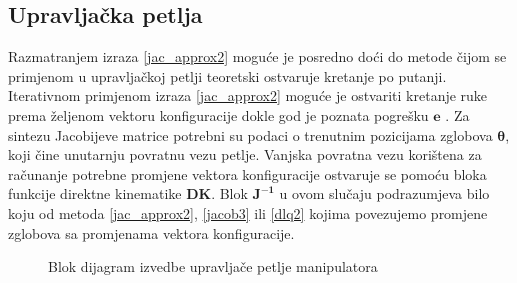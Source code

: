 \documentclass[times, utf8, diplomski, numeric]{fer}
\begin{document}
\subsection{Upravljačka petlja}\label{kin_upr}
Razmatranjem izraza \ref{jac_approx2} moguće je posredno doći do metode čijom se primjenom u upravljačkoj petlji teoretski ostvaruje kretanje po putanji. 
Iterativnom primjenom izraza \ref{jac_approx2} moguće je ostvariti kretanje ruke prema željenom vektoru konfiguracije dokle god je poznata pogrešku $\mathbf{e}$ . 
Za sintezu Jacobijeve matrice potrebni su podaci o trenutnim pozicijama zglobova $\bm{\theta}$, koji čine unutarnju povratnu vezu petlje.
Vanjska povratna vezu korištena za računanje potrebne promjene vektora konfiguracije ostvaruje se pomoću bloka funkcije direktne kinematike \textbf{DK}.
Blok $\mathbf{J^{-1}}$ u ovom slučaju podrazumjeva bilo koju od metoda \ref{jac_approx2}, \ref{jacob3} ili \ref{dlq2} kojima povezujemo promjene zglobova sa promjenama vektora konfiguracije.
\begin{figure}[!h]
\centering
{}
\caption{Blok dijagram izvedbe upravljače petlje manipulatora} \label{petlja}
\end{figure}
\end{document}
